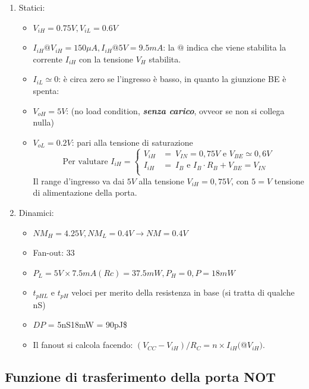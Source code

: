 \documentclass[
]{book}
\providecommand{\tightlist}{%
  \setlength{\itemsep}{0pt}\setlength{\parskip}{0pt}}
\begin{document}
\begin{enumerate}
\def\labelenumi{\arabic{enumi})}
\tightlist
\item
  Statici:

  \begin{itemize}
  \tightlist
  \item
    \(V_{iH} = 0.75V, V_{iL} = 0.6V\)
  \item
    \(I_{iH} @ V_{iH} = 150 \mu A, I_{iH} @ 5V = 9.5mA\): la \(@\)
    indica che viene stabilita la corrente \(I_{iH}\) con la tensione
    \(V_{H}\) stabilita.
  \item
    \(I_{iL} \simeq 0\): è circa zero se l'ingresso è basso, in quanto
    la giunzione BE è spenta:
  \item
    \(V_{oH} = 5V\): (no load condition, \textbf{\emph{senza carico}},
    ovveor se non si collega nulla)
  \item
    \(V_{oL} = 0.2V\): pari alla tensione di saturazione \[
     \text{Per valutare } I_{iH} = \left\{ \begin{array}{cl}
     V_{iH} & =\ V_{IN} = 0,75 V \text{ e } V_{BE}\simeq 0,6V\\
     I_{iH} & =\ I_{B} \text{ e } I_{B}\cdot R_{B}+V_{BE}=V_{IN}\\
     \end{array} \right.
     \] Il range d'ingresso va dai \(5V\) alla tensione
    \(V_{iH}=0,75V\), con \(5=V\) tensione di alimentazione della porta.
  \end{itemize}
\item
  Dinamici:

  \begin{itemize}
  \tightlist
  \item
    \(NM_{H} = 4.25V, NM_{L} = 0.4V \to NM = 0.4V\)
  \item
    Fan-out: 33
  \item
    \(P_{L} = 5V\times 7.5mA (Rc) = 37.5mW, P_{H} = 0, P =18mW\)
  \item
    \(t_{pHL}\) e \(t_{pH}\) veloci per merito della resistenza in base
    (si tratta di qualche nS)
  \item
    \(DP\) = 5nS\times 18mW = 90pJ\$
  \item
    Il fanout si calcola facendo:
    \((V_{CC}-V_{iH})/R_{C}=n\times I_{iH}(\)@\(V_{iH})\).
  \end{itemize}
\end{enumerate}

\subsection{Funzione di trasferimento della porta
NOT}\label{funzione-di-trasferimento-della-porta-not}
\end{document}
